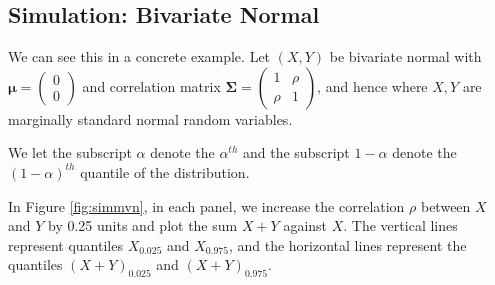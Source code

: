\documentclass[12pt,twoside]{smiththesis}
\begin{document}
\hypertarget{simulation-bivariate-normal}{%
\subsection{Simulation: Bivariate Normal}\label{simulation-bivariate-normal}}

We can see this in a concrete example. Let \((X,Y)\) be bivariate normal with \(\boldsymbol \mu = \begin{pmatrix} 0\\0\end{pmatrix}\) and correlation matrix \(\boldsymbol \Sigma = \begin{pmatrix} 1 & \rho \\ \rho & 1 \end{pmatrix}\), and hence where \(X, Y\) are marginally standard normal random variables.

We let the subscript \(\alpha\) denote the \(\alpha^{th}\) and the subscript \(1-\alpha\) denote the \((1-\alpha)^{th}\) quantile of the distribution.

In Figure \ref{fig:simmvn}, in each panel, we increase the correlation \(\rho\) between \(X\) and \(Y\) by 0.25 units and plot the sum \(X +Y\) against \(X\). The vertical lines represent quantiles \(X_{0.025}\) and \(X_{0.975}\), and the horizontal lines represent the quantiles \((X+Y)_{0.025}\) and \((X+Y)_{0.975}\).
\end{document}
